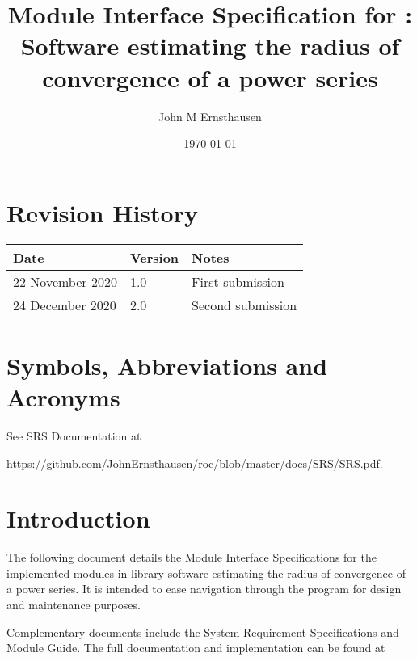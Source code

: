 \documentclass[12pt, titlepage]{article}
\begin{document}
\title{Module Interface Specification for : Software estimating the radius of convergence of
a power series}
\author{John M Ernsthausen}
\date{\today}

\maketitle


\section{Revision History}

\begin{tabularx}{\textwidth}{p{4cm}p{2cm}X}
\toprule {\bf Date} & {\bf Version} & {\bf Notes}\\
\midrule
  22 November 2020 & 1.0 & First submission\\
  24 December 2020 & 2.0 & Second submission\\
\bottomrule
\end{tabularx}

\newpage

\section{Symbols, Abbreviations and Acronyms}

See SRS Documentation at

\noindent \url{https://github.com/JohnErnsthausen/roc/blob/master/docs/SRS/SRS.pdf}.

\newpage

\tableofcontents

\newpage


\section{Introduction}

The following document details the Module Interface Specifications for the implemented
modules in library software  estimating the radius of convergence of a power series.
It is intended to ease navigation through the program for design and maintenance purposes.

Complementary documents include the System Requirement Specifications and Module Guide.
The full documentation and implementation can be found at
\end{document}
